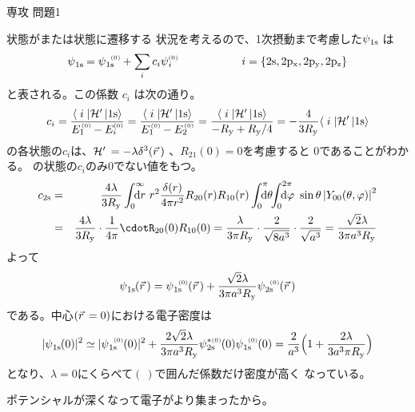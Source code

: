 \documentclass[fleqn]{jbook}
\begin{document}
\begin{answer}{専攻 問題1}{}
\begin{subanswers}
\begin{subsubanswers}
  \SubSubAnswer
    状態がまたは状態に遷移する
    状況を考えるので、1次摂動まで考慮した$\WF{\Orbit{1s}}$ は
%
    \[ \WF{\Orbit{1s}}%
       = \WF{\Orbit{1s}}\zpar + \sum_i c_i\WF{i}\zpar%
       \hspace{20mm}%
       i=\{\Orbit{2s},\Orbit{2p_x},\Orbit{2p_y},\Orbit{2p_z}\} \]
%
    と表される。この係数 $c_i$ は次の通り。
%
    \[ c_i = \frac{\Bracket{{\;}i{\;}}{\HI}{\Orbit{1s}}}%
                  {E_1\zpar - E_i\zpar}%
           =  \frac{\Bracket{{\;}i{\;}}{\HI}{\Orbit{1s}}}%
                  {E_1\zpar - E_2\zpar}%
           =  \frac{\Bracket{{\;}i{\;}}{\HI}{\Orbit{1s}}}%
                  {-R_{\rm y}+R_{\rm y}/4}%
           =  -\frac{4}{3R_{\rm y}}%
               \Bracket{{\;}i{\;}}{\HI}{\Orbit{1s}} \]
%
    の各状態の$c_i$は、${\cal H}^\prime\,=-\lambda\delta^3(\vec{r}\,)$
    、$R_{21}(0)=0$を考慮すると $0$であることがわかる。
    の状態の$c_i$のみ$0$でない値をもつ。
%
    \begin{eqnarray*}
      c_{\Orbit{2s}}%
        &=&  \frac{4\lambda}{3R_{\rm y}}%
             \Dint{0}{\infty}{\d{r}}%
             r^2\frac{\delta(r)}{4\pi r^2}R_{20}(r)R_{10}(r)%
             \Dint{0}{\pi}{\d{\theta}}\bquad%
             \Dint{0}{2\pi}{\d{\varphi}}\sin\theta%
             \left|Y_{00}(\theta,\varphi)\right|^2 \\
        &=&  \frac{4\lambda}{3R_{\rm y}}\cdot \frac{1}{4\pi}\cdot%
             R_{20}(0)R_{10}(0)%
         =   \frac{\lambda}{3\pi R_{\rm y}}\cdot%
             \frac{2}{\sqrt{8a^3}}\cdot%
             \frac{2}{\sqrt{a^3}}%
         =   \frac{\sqrt{2}\lambda}{3\pi a^3 R_{\rm y}}
    \end{eqnarray*}
%
    よって
%
    \[ \WF{\Orbit{1s}}(\vr)%
       = \WF{\Orbit{1s}}\zpar(\vr)
         +\frac{\sqrt{2}\lambda}{3\pi a^3 R_{\rm y}}
         \WF{\Orbit{2s}}\zpar(\vr) \]
%
    である。中心$(\vec{r}\,=0)$における電子密度は
%
    \[ |\WF{\Orbit{1s}}(0)|^2%
       \simeq |\WF{\Orbit{1s}}\zpar(0)|^2%
             +\frac{2\sqrt{2}\lambda}{3\pi a^3 R_{\rm y}}%
              \WFHC{\Orbit{2s}}\zpar(0)\WF{\Orbit{1s}}\zpar(0)%
       =      \frac{2}{a^3}%
              \Bigl( 1+\frac{2\lambda}{3a^3\pi R_{\rm y}} \Bigr) \]
%
    となり、$\lambda=0$にくらべて$(\ )$で囲んだ係数だけ密度が高く
    なっている。

  \SubSubAnswer
    ポテンシャルが深くなって電子がより集まったから。

  \end{subsubanswers}



\end{subanswers}
\end{answer}
\end{document}
